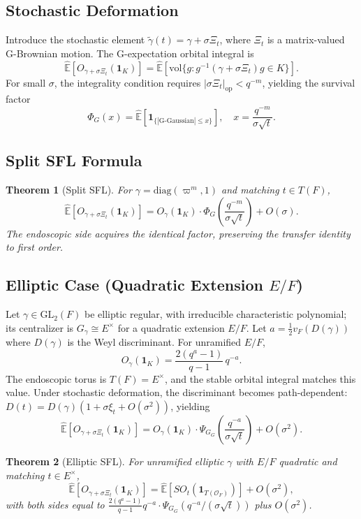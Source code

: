 \documentclass[11pt,a4paper]{article}
\newtheorem{theorem}{Theorem}[section]
\theoremstyle{definition}
\newcommand{\GL}{\mathrm{GL}}
\newcommand{\diag}{\mathrm{diag}}
\newcommand{\GExp}{\hat{\mathbb{E}}}
\newcommand{\PSI}{\Psi_G}
\begin{document}
\subsection{Stochastic Deformation}

Introduce the stochastic element $\widetilde{\gamma}(t) = \gamma + \sigma \Xi_t$, where $\Xi_t$ is a matrix-valued G-Brownian motion. The G-expectation orbital integral is
\[
\GExp\left[O_{\gamma+\sigma\Xi_t}(\mathbf{1}_K)\right] = \GExp\left[\mathrm{vol}\{g : g^{-1}(\gamma+\sigma\Xi_t)g \in K\}\right].
\]
For small $\sigma$, the integrality condition requires $|\sigma \Xi_t|_{\mathrm{op}} < q^{-m}$, yielding the survival factor
\[
\Phi_G(x) = \GExp\left[\mathbf{1}_{\{|\mathrm{G\text{-}Gaussian}| \le x\}}\right], \quad x = \frac{q^{-m}}{\sigma\sqrt{t}}.
\]

\subsection{Split SFL Formula}

\begin{theorem}[Split SFL]\label{thm:split}
For $\gamma = \diag(\varpi^m,1)$ and matching $t\in T(F)$,
\[
\GExp\left[O_{\gamma+\sigma\Xi_t}(\mathbf{1}_K)\right] = O_\gamma(\mathbf{1}_K) \cdot \Phi_G\!\left(\frac{q^{-m}}{\sigma\sqrt{t}}\right) + O(\sigma).
\]
The endoscopic side acquires the identical factor, preserving the transfer identity to first order.
\end{theorem}

\subsection{Elliptic Case (Quadratic Extension $E/F$)}

Let $\gamma \in \GL_2(F)$ be elliptic regular, with irreducible characteristic polynomial; its centralizer is $G_\gamma \cong E^\times$ for a quadratic extension $E/F$. Let $a = \frac{1}{2}v_F(D(\gamma))$ where $D(\gamma)$ is the Weyl discriminant. For unramified $E/F$,
\[
O_\gamma(\mathbf{1}_K) = \frac{2(q^a-1)}{q-1}\,q^{-a}.
\]
The endoscopic torus is $T(F) = E^\times$, and the stable orbital integral matches this value. Under stochastic deformation, the discriminant becomes path-dependent: $D(t) = D(\gamma)(1 + \sigma\xi_t + O(\sigma^2))$, yielding
\[
\GExp\left[O_{\gamma+\sigma\Xi_t}(\mathbf{1}_K)\right] = O_\gamma(\mathbf{1}_K) \cdot \PSI_G\!\left(\frac{q^{-a}}{\sigma\sqrt{t}}\right) + O(\sigma^2).
\]

\begin{theorem}[Elliptic SFL]\label{thm:elliptic}
For unramified elliptic $\gamma$ with $E/F$ quadratic and matching $t\in E^\times$,
\[
\GExp\left[O_{\gamma+\sigma\Xi_t}(\mathbf{1}_K)\right] = \GExp\left[SO_t(\mathbf{1}_{T(\mathcal{O}_F)})\right] + O(\sigma^2),
\]
with both sides equal to $\frac{2(q^a-1)}{q-1}q^{-a}\cdot \PSI_G(q^{-a}/(\sigma\sqrt{t}))$ plus $O(\sigma^2)$.
\end{theorem}
\end{document}
